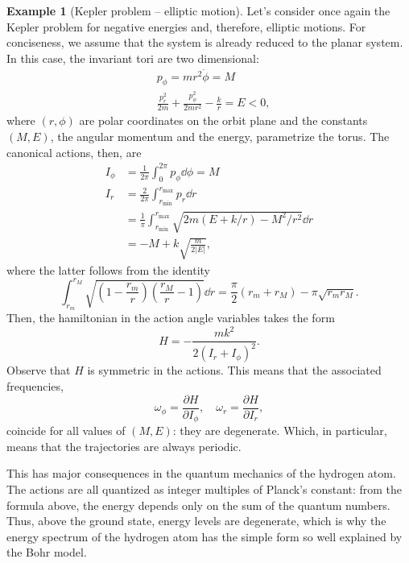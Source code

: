 \documentclass[english,fontsize=11pt,paper=b5]{scrbook}
\theoremstyle{definition}
\newtheorem{example}{Example}[chapter]
\begin{document}
      \begin{example}[Kepler problem -- elliptic motion]
        Let's consider once again the Kepler problem for negative energies and, therefore, elliptic motions.
        For conciseness, we assume that the system is already reduced to the planar system. In this case, the invariant tori are two dimensional:
        \begin{align}
     & p_\phi = m r^2 \dot \phi = M                                       \\
     & \frac{p_r^2}{2 m} + \frac{p_\phi^2}{2 m r^2} - \frac{k}{r} = E <0,
        \end{align}
        where $(r,\phi)$ are polar coordinates on the orbit plane and the constants $(M,E)$, the angular momentum and the energy, parametrize the torus.
        The canonical actions, then, are
        \begin{align}
          I_\phi & = \frac{1}{2\pi} \int_0^{2\pi} p_\phi \dd \phi = M                                       \\
          I_r    & = \frac{2}{2\pi} \int_{r_{\mathrm{min}}}^{r_{\mathrm{max}}} p_r \dd r                    \\
                 & = \frac1\pi \int_{r_{\mathrm{min}}}^{r_{\mathrm{max}}} \sqrt{2m(E + k/r) - M^2/r^2}\dd r \\
                 & = - M + k \sqrt{\frac{m}{2|E|}},
        \end{align}
        where the latter follows from the identity
        \begin{equation}
          \int_{r_{m}}^{r_{M}} \sqrt{\left(1-\frac{r_m}r\right)\left(\frac{r_M}r-1\right)}\dd r = \frac{\pi}2(r_m + r_M) - \pi \sqrt{r_m r_M}.
        \end{equation}
        Then, the hamiltonian in the action angle variables takes the form
        \begin{equation}
          H = - \frac{mk^2}{2(I_r + I_\phi)^2}.
        \end{equation}
        Observe that $H$ is symmetric in the actions. This means that the associated frequencies,
        \begin{equation}
          \omega_\phi = \frac{\partial H}{\partial I_\phi}, \quad
          \omega_r = \frac{\partial H}{\partial I_r},
        \end{equation}
        coincide for all values of $(M,E)$: they are degenerate. Which, in particular, means that the trajectories are always periodic.

        This has major consequences in the quantum mechanics of the hydrogen atom. The actions are all quantized as integer multiples of Planck's constant: from the formula above, the energy depends only on the sum of the quantum numbers. Thus, above the ground state, energy levels are degenerate, which is why the energy spectrum of the hydrogen atom has the simple form so well explained by the Bohr model.


\end{example}
\end{document}
